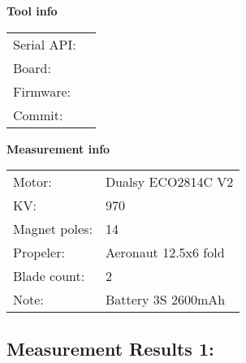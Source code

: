 \documentclass[10pt]{article}
\begin{document}
\noindent
{\large \bf Tool info}
\vspace{3mm}

\noindent
\begin{tabular}{ll}
Serial API:  & \\ 
Board:       & \\ 
Firmware:    & \\ 
Commit:      & 
\end{tabular}
\vspace{3mm}

\noindent
{\large \bf Measurement info}
\vspace{3mm}

\noindent
\begin{tabular}{ll}
Motor:        & Dualsy ECO2814C V2\\ 
KV:           & 970\\ 
Magnet poles: & 14\\ 
Propeler:     & Aeronaut 12.5x6 fold\\ 
Blade count:  & 2\\ 
Note:         & Battery 3S 2600mAh
\end{tabular}

\vspace{3mm}


\subsection*{\large \bf Measurement Results 1:}
\end{document}
